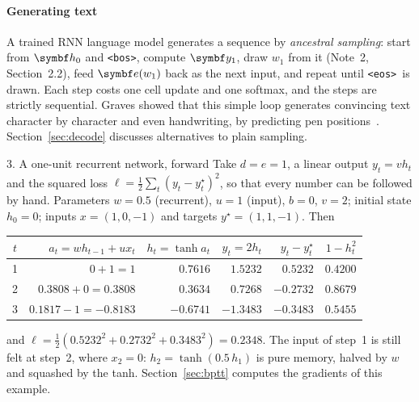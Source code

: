 \documentclass[11pt]{article}
\newcommand{\hv}{\vect{h}}
\newcommand{\yv}{\vect{y}}
\newcommand{\ev}{\vect{e}}
\newcommand{\bos}{\texttt{<bos>}}
\newcommand{\eos}{\texttt{<eos>}}
\begin{document}
\paragraph{Generating text} A trained RNN language model generates a sequence by \emph{ancestral sampling}: start
from $\hv_0$ and \bos, compute $\yv_1$, draw $w_1$ from it (Note~2, Section~2.2), feed $\ev(w_1)$ back as the next
input, and repeat until \eos\ is drawn. Each step costs one cell update and one softmax, and the steps are strictly
sequential. Graves showed that this simple loop generates convincing text character by character and even
handwriting, by predicting pen positions~\cite{graves2013}. Section~\ref{sec:decode} discusses alternatives to plain
sampling.

\begin{worked}{3. A one-unit recurrent network, forward}
Take $d = e = 1$, a linear output $y_t = v h_t$ and the squared loss $\ell = \frac12\sum_t (y_t - y^\star_t)^2$, so that every
number can be followed by hand. Parameters $w = 0.5$ (recurrent), $u = 1$ (input), $b = 0$, $v = 2$; initial state
$h_0 = 0$; inputs $x = (1, 0, -1)$ and targets $y^\star = (1, 1, -1)$. Then
\begin{center}\small
\begin{tabular}{@{}crrrrr@{}}
\toprule
$t$ & $a_t = wh_{t-1} + ux_t$ & $h_t = \tanh a_t$ & $y_t = 2h_t$ & $y_t - y^\star_t$ & $1 - h_t^2$ \\
\midrule
1 & $0 + 1 = 1$ & $0.7616$ & $1.5232$ & $0.5232$ & $0.4200$ \\
2 & $0.3808 + 0 = 0.3808$ & $0.3634$ & $0.7268$ & $-0.2732$ & $0.8679$ \\
3 & $0.1817 - 1 = -0.8183$ & $-0.6741$ & $-1.3483$ & $-0.3483$ & $0.5455$ \\
\bottomrule
\end{tabular}
\end{center}
and $\ell = \frac12(0.5232^2 + 0.2732^2 + 0.3483^2) = 0.2348$. The input of step~1 is still felt at step~2, where $x_2 = 0$:
$h_2 = \tanh(0.5\,h_1)$ is pure memory, halved by $w$ and squashed by the tanh. Section~\ref{sec:bptt} computes the
gradients of this example.
\end{worked}
\end{document}
